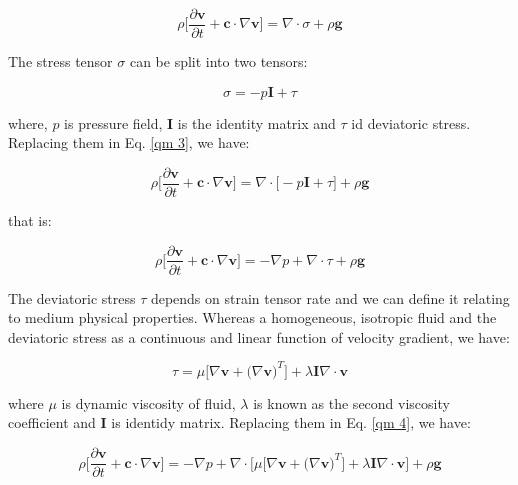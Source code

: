 \begin{equation} \label{qm 3}
 \rho \Bigg[ \frac{\partial \textbf{v}}{\partial t} + \textbf{c} \cdot \nabla \textbf{v} \Bigg]
 =
 \nabla \cdot \sigma
 +
 \rho \textbf{g}
\end{equation}

\medskip
\noindent
The stress tensor $\sigma$ can be split into
two tensors:

\begin{equation}
 \sigma = -p \textbf{I} + \tau
\end{equation}

\medskip
\noindent
where, $p$ is pressure field, \textbf{I} is the identity matrix and
$\tau$ id deviatoric stress. 
Replacing them in Eq. \ref{qm 3}, we have:

\begin{equation}
 \rho \Bigg[ \frac{\partial \textbf{v}}{\partial t} + \textbf{c} \cdot \nabla \textbf{v} \Bigg]
 =
 \nabla \cdot \big[ -p \textbf{I} + \tau \big]
 +
 \rho \textbf{g}
\end{equation}

\medskip
\noindent
that is:

\begin{equation} \label{qm 4}
 \rho \Bigg[ \frac{\partial \textbf{v}}{\partial t} + \textbf{c} \cdot \nabla \textbf{v} \Bigg]
 =
 -
 \nabla p
 +
 \nabla \cdot \tau
 +
 \rho \textbf{g}
\end{equation}

\medskip
The deviatoric stress $\tau$ depends on strain tensor rate and
we can define it relating to medium physical properties.
Whereas a homogeneous, isotropic fluid and the deviatoric stress
as a continuous and linear function of velocity gradient,
we have:

\begin{equation}
 \tau = \mu \big[ \nabla \textbf{v} + \big( \nabla \textbf{v} \big)^{T} \big]
      + \lambda \textbf{I} \nabla \cdot \textbf{v}
\end{equation}

\medskip
\noindent
where $\mu$ is dynamic viscosity of fluid,
$\lambda$ is known as the second viscosity coefficient and
\textbf{I} is identidy matrix.
Replacing them in Eq. \ref{qm 4}, we have:



\begin{equation} 
 \rho \Bigg[ \frac{\partial \textbf{v}}{\partial t} + \textbf{c} \cdot \nabla \textbf{v} \Bigg]
 =
 -
 \nabla p
 +
 \nabla \cdot \big[ 
 \mu \big[ \nabla \textbf{v} + \big( \nabla \textbf{v} \big)^{T} \big]
 + \lambda \textbf{I} \nabla \cdot \textbf{v}
 \big]
 +
 \rho \textbf{g}
\end{equation}



